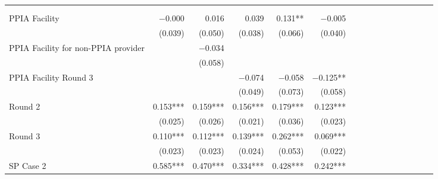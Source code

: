 \begin{tabular}{@{\extracolsep{5pt}}lrrrrrrrrrrrrrrr}
\toprule
& \multicolumn{1}{p{0.13\linewidth}}{\centering{(1)}} & \multicolumn{1}{p{0.13\linewidth}}{\centering{(2)}} & \multicolumn{1}{p{0.13\linewidth}}{\centering{(3)}} & \multicolumn{1}{p{0.13\linewidth}}{\centering{(4)}} & \multicolumn{1}{p{0.13\linewidth}}{\centering{(5)}} \\
& \multicolumn{1}{p{0.13\linewidth}}{\centering{Pooled Model}} & \multicolumn{1}{p{0.13\linewidth}}{\centering{PPIA Providers}} & \multicolumn{1}{p{0.13\linewidth}}{\centering{Separate Effects}} & \multicolumn{1}{p{0.13\linewidth}}{\centering{Separate PPIA}} & \multicolumn{1}{p{0.13\linewidth}}{\centering{Separate Other}} \\
\hline
PPIA Facility & $-$0.000\phantom{\phantom{)}***} & 0.016\phantom{\phantom{)}***} & 0.039\phantom{\phantom{)}***} & 0.131\phantom{)}**\phantom{*} & $-$0.005\phantom{\phantom{)}***} \\
& (0.039)\phantom{***} & (0.050)\phantom{***} & (0.038)\phantom{***} & (0.066)\phantom{***} & (0.040)\phantom{***} \\
PPIA Facility for non-PPIA provider & \phantom{***} & $-$0.034\phantom{\phantom{)}***} & \phantom{***} & \phantom{***} & \phantom{***} \\
& \phantom{***} & (0.058)\phantom{***} & \phantom{***} & \phantom{***} & \phantom{***} \\
PPIA Facility Round 3 & \phantom{***} & \phantom{***} & $-$0.074\phantom{\phantom{)}***} & $-$0.058\phantom{\phantom{)}***} & $-$0.125\phantom{)}**\phantom{*} \\
& \phantom{***} & \phantom{***} & (0.049)\phantom{***} & (0.073)\phantom{***} & (0.058)\phantom{***} \\
Round 2 & 0.153\phantom{)}*** & 0.159\phantom{)}*** & 0.156\phantom{)}*** & 0.179\phantom{)}*** & 0.123\phantom{)}*** \\
& (0.025)\phantom{***} & (0.026)\phantom{***} & (0.021)\phantom{***} & (0.036)\phantom{***} & (0.023)\phantom{***} \\
Round 3 & 0.110\phantom{)}*** & 0.112\phantom{)}*** & 0.139\phantom{)}*** & 0.262\phantom{)}*** & 0.069\phantom{)}*** \\
& (0.023)\phantom{***} & (0.023)\phantom{***} & (0.024)\phantom{***} & (0.053)\phantom{***} & (0.022)\phantom{***} \\
SP Case 2 & 0.585\phantom{)}*** & 0.470\phantom{)}*** & 0.334\phantom{)}*** & 0.428\phantom{)}*** & 0.242\phantom{)}*** \\

\end{tabular}
